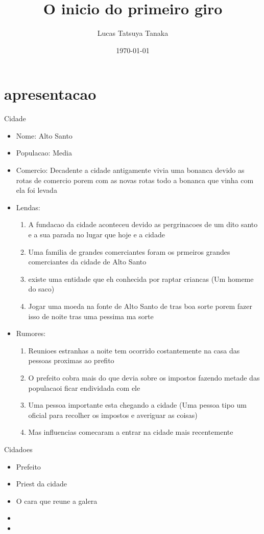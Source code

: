 \documentclass{book}
\title{O inicio do primeiro giro}
\author{Lucas Tatsuya Tanaka}
\date{\today}
\begin{document}
\maketitle
\tableofcontents

 \chapter{apresentacao}
 
{\huge Cidade}

\begin{itemize}
    \item Nome: Alto Santo 
    \item  Populacao: Media   
    \item Comercio: Decadente a cidade antigamente vivia uma bonanca devido as rotas 
        de comercio porem com as novas rotas todo a bonanca que vinha com ela foi levada
    \item Lendas:
        \begin{enumerate}
            \item A fundacao da cidade aconteceu devido as pergrinacoes de um dito santo 
                e a sua parada no lugar que hoje e a cidade 
            \item Uma familia de grandes comerciantes foram os prmeiros grandes comerciantes 
                da cidade de Alto Santo
            \item existe uma entidade que eh conhecida por raptar criancas (Um homeme do 
                saco)
            \item Jogar uma moeda na fonte de Alto Santo de tras boa sorte porem fazer isso 
                de noite tras uma pessima ma sorte 
        \end{enumerate}
    \item Rumores:
        \begin{enumerate}
            \item Reunioes estranhas a noite tem ocorrido costantemente na casa das pessoas
                proximas ao prefito
            \item O prefeito cobra mais do que devia sobre os impostos fazendo metade das
                populacaoi ficar endividada com ele
            \item Uma pessoa importante esta chegando a cidade (Uma pessoa tipo um oficial 
                para recolher os impostos e averiguar as coisas)
            \item Mas influencias comecaram a entrar na cidade mais recentemente 
        \end{enumerate}
\end{itemize}
\linebreak 
{\huge Cidadoes }
\begin{itemize}
    \item Prefeito
    \item Priest da cidade
    \item O cara que reune a galera
    \item
    \item
\end{itemize}
\end{document}
